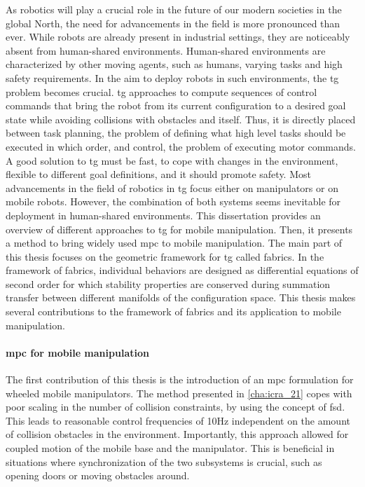 
As robotics will play a crucial role in the future of our
modern societies in the global North, the need for
advancements in the field is more pronounced than ever.
While robots are already present in industrial settings,
they are noticeably absent from human-shared environments.
Human-shared environments are characterized by other moving agents, 
such as humans, varying tasks and high safety requirements.
In the aim to deploy robots in such environments, the
\ac{tg} problem becomes crucial. \Ac{tg} approaches to compute sequences
of control commands that bring the robot from its current
configuration to a desired goal state while avoiding
collisions with obstacles and itself. Thus, it is directly placed between 
task planning, the problem of defining what high level tasks should be executed
in which order, and control, the problem of executing motor commands.
A good solution to \ac{tg} must be fast, to cope with changes in the
environment, flexible to different goal definitions, and it should promote safety.
Most advancements in the field of robotics in \ac{tg} focus either on
manipulators or on mobile robots. However, the combination of both
systems seems inevitable for deployment in human-shared environments.
This dissertation provides an overview of different approaches to \ac{tg} for
mobile manipulation. Then, it presents a method to bring widely used \ac{mpc}
to mobile manipulation. The main part of this thesis focuses on the geometric
framework for \ac{tg} called \ac{fabrics}. In the framework of \ac{fabrics},
individual behaviors are designed as differential equations of second order
for which stability properties are conserved during summation transfer between
different manifolds of the configuration space. This thesis makes several
contributions to the framework of \ac{fabrics} and its application to mobile
manipulation.

\paragraph{\acf{mpc} for mobile manipulation}
The first contribution of this thesis is the introduction of an \ac{mpc}
formulation for wheeled mobile manipulators. The method presented in \cref{cha:icra_21}
copes with poor scaling in the number of collision constraints, by using the
concept of \ac{fsd}. This leads to reasonable control frequencies of 10Hz
independent on the amount of collision obstacles in the environment.
Importantly, this approach allowed for coupled motion of the mobile base and the
manipulator. This is beneficial in situations where synchronization of the two
subsystems is crucial, such as opening doors or moving obstacles around.

